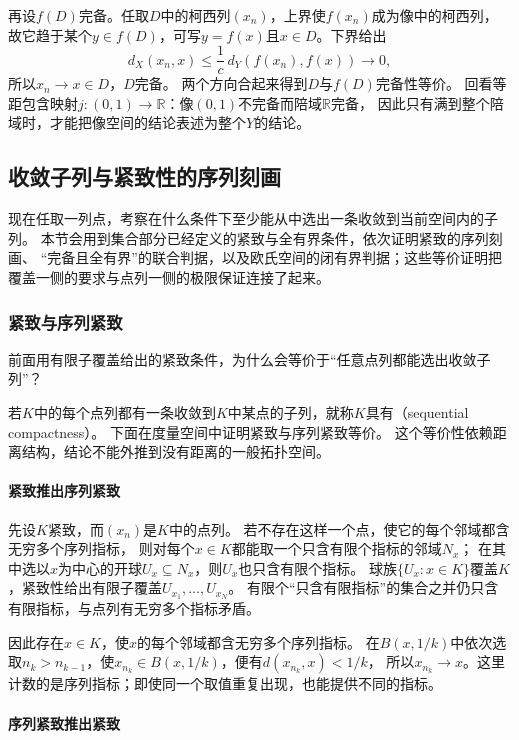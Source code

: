 再设$f(D)$完备。任取$D$中的柯西列$(x_n)$，上界使$f(x_n)$成为像中的柯西列，
故它趋于某个$y\in f(D)$，可写$y=f(x)$且$x\in D$。下界给出
\[
  d_X(x_n,x)\leq\frac1c\,d_Y(f(x_n),f(x))\to0,
\]
所以$x_n\to x\in D$，$D$完备。
两个方向合起来得到$D$与$f(D)$完备性等价。
回看等距包含映射$j:(0,1)\to\mathbb R$：像$(0,1)$不完备而陪域$\mathbb R$完备，
因此只有满到整个陪域时，才能把像空间的结论表述为整个$Y$的结论。

\subsection{收敛子列与紧致性的序列刻画}
\label{sec:metric-compactness-tests}

现在任取一列点，考察在什么条件下至少能从中选出一条收敛到当前空间内的子列。
本节会用到集合部分已经定义的紧致与全有界条件，依次证明紧致的序列刻画、
“完备且全有界”的联合判据，以及欧氏空间的闭有界判据；这些等价证明把覆盖一侧的要求与点列一侧的极限保证连接了起来。

\subsubsection{紧致与序列紧致}
\label{sec:metric-compact-sequential-tests}

前面用有限子覆盖给出的紧致条件，为什么会等价于“任意点列都能选出收敛子列”？

若$K$中的每个点列都有一条收敛到$K$中某点的子列，就称$K$具有（sequential compactness）。
下面在度量空间中证明紧致与序列紧致等价。
这个等价性依赖距离结构，结论不能外推到没有距离的一般拓扑空间。

\paragraph{紧致推出序列紧致}

先设$K$紧致，而$(x_n)$是$K$中的点列。
若不存在这样一个点，使它的每个邻域都含无穷多个序列指标，
则对每个$x\in K$都能取一个只含有限个指标的邻域$N_x$；
在其中选以$x$为中心的开球$U_x\subseteq N_x$，则$U_x$也只含有限个指标。
球族$\{U_x:x\in K\}$覆盖$K$，紧致性给出有限子覆盖$U_{x_1},\ldots,U_{x_N}$。
有限个“只含有限指标”的集合之并仍只含有限指标，与点列有无穷多个指标矛盾。

因此存在$x\in K$，使$x$的每个邻域都含无穷多个序列指标。
在$B(x,1/k)$中依次选取$n_k>n_{k-1}$，使$x_{n_k}\in B(x,1/k)$，便有$d(x_{n_k},x)<1/k$，
所以$x_{n_k}\to x$。这里计数的是序列指标；即使同一个取值重复出现，也能提供不同的指标。

\paragraph{序列紧致推出紧致}

